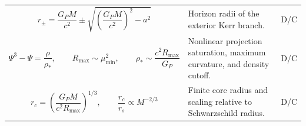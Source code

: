 \documentclass[11pt]{article}
\begin{document}
\begin{longtable}{
>{\raggedright\arraybackslash}p{}
>{\raggedright\arraybackslash}p{}
>{\centering\arraybackslash}p{}
}
\[
r_\pm=\frac{G_PM}{c^2}
\pm
\sqrt{
\left(\frac{G_PM}{c^2}\right)^2-a^2
}
\]
& Horizon radii of the exterior Kerr branch. & D/C \\

\[
\Psi^3-\Psi=\frac{\rho}{\rho_*},
\qquad
R_{\max}\sim\mu_{\min}^2,
\qquad
\rho_*\sim\frac{c^2R_{\max}}{G_P}
\]
& Nonlinear projection saturation, maximum curvature, and density cutoff. & D/C \\

\[
r_c=
\left(
\frac{G_PM}{c^2R_{\max}}
\right)^{1/3},
\qquad
\frac{r_c}{r_s}\propto M^{-2/3}
\]
& Finite core radius and scaling relative to Schwarzschild radius. & D/C \\

\bottomrule
\end{longtable}

\endgroup
\end{document}
